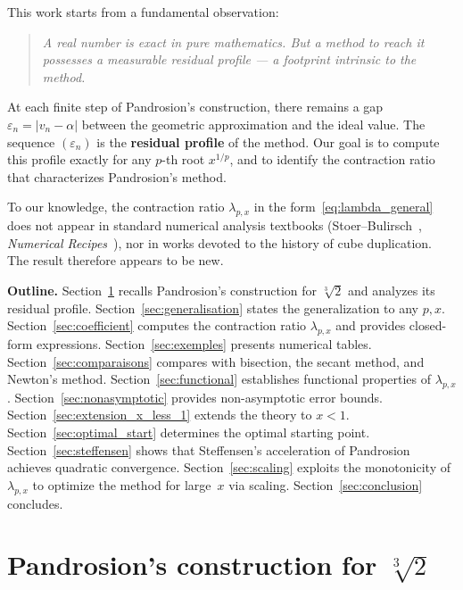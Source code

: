 \documentclass[11pt,a4paper]{article}
\theoremstyle{definition}
\newcommand{\cbrt}[1]{\sqrt[3]{#1}}
\newcommand{\eps}{\varepsilon}
\begin{document}
\medskip

This work starts from a fundamental observation:

\begin{quote}
\itshape A real number is exact in pure mathematics. But a method to reach it possesses a measurable residual profile --- a footprint intrinsic to the method.
\end{quote}

At each finite step of Pandrosion's construction, there remains a gap $\eps_n = |v_n - \alpha|$ between the geometric approximation and the ideal value. The sequence $(\eps_n)$ is the \textbf{residual profile} of the method. Our goal is to compute this profile exactly for any $p$-th root $x^{1/p}$, and to identify the contraction ratio that characterizes Pandrosion's method.

\medskip

To our knowledge, the contraction ratio $\lambda_{p,x}$ in the form~\eqref{eq:lambda_general} does not appear in standard numerical analysis textbooks (Stoer--Bulirsch~\cite{stoer}, \textit{Numerical Recipes}~\cite{numrecipes}), nor in works devoted to the history of cube duplication. The result therefore appears to be new.

\medskip

\textbf{Outline.} Section~\ref{sec:pandrosion3} recalls Pandrosion's construction for $\cbrt{2}$ and analyzes its residual profile. Section~\ref{sec:generalisation} states the generalization to any $p, x$. Section~\ref{sec:coefficient} computes the contraction ratio $\lambda_{p,x}$ and provides closed-form expressions. Section~\ref{sec:exemples} presents numerical tables. Section~\ref{sec:comparaisons} compares with bisection, the secant method, and Newton's method. Section~\ref{sec:functional} establishes functional properties of $\lambda_{p,x}$. Section~\ref{sec:nonasymptotic} provides non-asymptotic error bounds. Section~\ref{sec:extension_x_less_1} extends the theory to $x < 1$. Section~\ref{sec:optimal_start} determines the optimal starting point. Section~\ref{sec:steffensen} shows that Steffensen's acceleration of Pandrosion achieves quadratic convergence. Section~\ref{sec:scaling} exploits the monotonicity of $\lambda_{p,x}$ to optimize the method for large~$x$ via scaling. Section~\ref{sec:conclusion} concludes.

\section{Pandrosion's construction for \texorpdfstring{$\cbrt{2}$}{cbrt(2)}}
\label{sec:pandrosion3}
\end{document}
